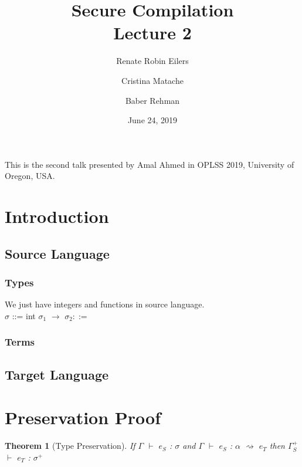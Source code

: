 \documentclass{article}
\title{Secure Compilation \\ \Large{Lecture 2}}
\author{Renate Robin Eilers  \and Cristina Matache \and Baber Rehman}
\date{June 24, 2019}
\newtheorem{theorem}{Theorem}[section]
\begin{document}
\maketitle

This is the second talk presented by Amal Ahmed in OPLSS 2019, University of Oregon, USA.

\section{Introduction}

\subsection{Source Language}

\subsubsection{Types}

We just have integers and functions in source language. \\

$\sigma$ ::= int \textbar \hspace{0.1cm} $\sigma_1$ $\rightarrow$ $\sigma_2 ::= $

\subsubsection{Terms}

\subsection{Target Language}

\section{Preservation Proof}

\begin{theorem}[Type Preservation]
If $\Gamma$ $\vdash$ $e_S$ : $\sigma$ and  $\Gamma$ $\vdash$ $e_S$ : $\alpha$ $\rightsquigarrow$ $e_T$ then $\Gamma_S^+$ $\vdash$ $e_T$ : $\sigma^+$
\end{theorem}
\end{document}
